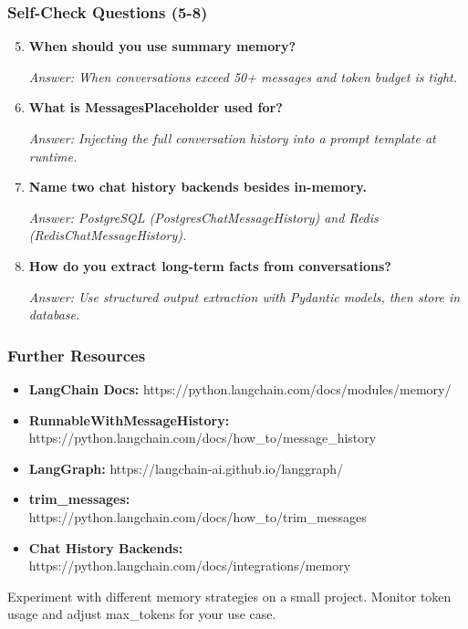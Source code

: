 \documentclass[aspectratio=169,11pt]{beamer}
\begin{document}
\begin{frame}[fragile]
  \frametitle{Self-Check Questions (5-8)}
  \begin{enumerate}
    \setcounter{enumi}{4}
    \item \textbf{When should you use summary memory?}
    \begin{small}
      \textit{Answer: When conversations exceed 50+ messages and token budget is tight.}
    \end{small}

    \item \textbf{What is MessagesPlaceholder used for?}
    \begin{small}
      \textit{Answer: Injecting the full conversation history into a prompt template at runtime.}
    \end{small}

    \item \textbf{Name two chat history backends besides in-memory.}
    \begin{small}
      \textit{Answer: PostgreSQL (PostgresChatMessageHistory) and Redis (RedisChatMessageHistory).}
    \end{small}

    \item \textbf{How do you extract long-term facts from conversations?}
    \begin{small}
      \textit{Answer: Use structured output extraction with Pydantic models, then store in database.}
    \end{small}
  \end{enumerate}
\end{frame}

\begin{frame}
  \frametitle{Further Resources}
  \begin{itemize}
    \item \textbf{LangChain Docs:} https://python.langchain.com/docs/modules/memory/
    \item \textbf{RunnableWithMessageHistory:} https://python.langchain.com/docs/how\_to/message\_history
    \item \textbf{LangGraph:} https://langchain-ai.github.io/langgraph/
    \item \textbf{trim\_messages:} https://python.langchain.com/docs/how\_to/trim\_messages
    \item \textbf{Chat History Backends:} https://python.langchain.com/docs/integrations/memory
  \end{itemize}
  \vspace{1em}
  \begin{conceptbox}
    Experiment with different memory strategies on a small project.
    Monitor token usage and adjust max\_tokens for your use case.
  \end{conceptbox}
\end{frame}
\end{document}
